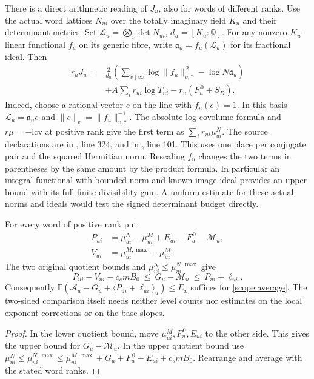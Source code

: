 There is a direct arithmetic reading of \(J_u\), also for words of
different ranks. Use the actual word lattices \(N_{ui}\) over the
totally imaginary field \(K_u\) and their determinant metrics. Set
\(\mathcal L_u=\bigotimes_i\det N_{ui}\), \(d_u=[K_u:\mathbb Q]\).
For any nonzero \(K_u\)-linear functional \(f_u\) on its generic fibre, write
\(\mathfrak a_u=f_u(\mathcal L_u)\) for its fractional ideal. Then
\[
\begin{aligned}
 r_u J_u={}&\frac{2}{d_u}\left(
       \sum_{v\mid\infty}\log\|f_u\|_{v,*}^{\,2}
                        -\log N\mathfrak a_u\right)\\
 &+A\sum_i r_{ui}\log T_{ui}-r_u(F_u^{\,0}+S_D).
\end{aligned}
\]
Indeed, choose a rational vector \(e\) on the line with \(f_u(e)=1\).
In this basis \(\mathcal L_u=\mathfrak a_u e\) and
\(\|e\|_v=\|f_u\|_{v,*}^{-1}\). The absolute log-covolume formula
and \(r\mu=-\mathrm{lcv}\) at positive rank give the first term
as \(\sum_i r_{ui}\mu^N_{ui}\). The source declarations are
 in , line 324, and
 in ,
line 101. This uses one place
per conjugate pair and the squared Hermitian norm. Rescaling \(f_u\)
changes the two terms in parentheses by the same amount by the product
formula. In particular an integral functional with bounded norm
and known image ideal provides an upper bound with its full finite
divisibility gain. A uniform estimate for these actual norms and ideals
would test the signed determinant budget directly.

\begin{proposition}\label{geom:relative-test}
For every word of positive rank put
\[
\begin{aligned}
 P_{ui}&=\mu^N_{ui}-\mu^M_{ui}+E_{ui}-F_u^{\,0}-\mathcal M_u,\\
 V_{ui}&=\mu^{M,\max}_{ui}-\mu^M_{ui}.
\end{aligned}
\]
The two original quotient bounds and \(\mu^N_{ui}\le\mu^{N,\max}_{ui}\)
give
\[
 P_{ui}-V_{ui}-c_s mB_0
      \ \le\ G_u-\mathcal M_u\ \le\ P_{ui}+\ell_{ui}.
\]
Consequently
\(\mathbb E(\mathcal A_u-G_u+\langle P_{ui}+\ell_{ui}\rangle_u)
\le E_x\) suffices for \eqref{scope:average}. The two-sided comparison
itself needs neither level counts nor estimates on the local exponent
corrections or on the base slopes.
\end{proposition}
\begin{proof}
In the lower quotient bound, move \(\mu^M_{ui},F_u^{\,0},E_{ui}\)
to the other side. This gives the upper bound for \(G_u-\mathcal M_u\).
In the upper quotient bound use
\(\mu^N_{ui}\le\mu^{N,\max}_{ui}\le
\mu^{M,\max}_{ui}+G_u+F_u^{\,0}-E_{ui}+c_s mB_0\).
Rearrange and average with the stated word ranks.
\end{proof}

